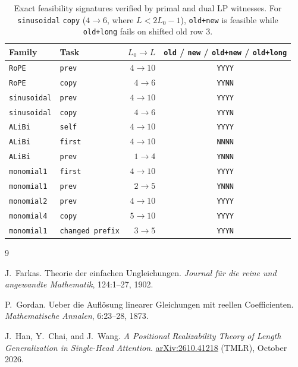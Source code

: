 \documentclass[11pt]{article}
\theoremstyle{plain}
\theoremstyle{definition}
\theoremstyle{remark}
\begin{document}
\begin{table}[h]
\centering
\begin{tabular}{@{}llrc@{}}
\toprule
Family & Task & $L_0 \to L$ & \texttt{old} / \texttt{new} / \texttt{old+new} / \texttt{old+long} \\
\midrule
\texttt{RoPE}       & \texttt{prev}           & $4 \to 10$ & \texttt{YYYY} \\
\texttt{RoPE}       & \texttt{copy}           & $4 \to 6$  & \texttt{YYNN} \\
\texttt{sinusoidal} & \texttt{prev}           & $4 \to 10$ & \texttt{YYYY} \\
\texttt{sinusoidal} & \texttt{copy}           & $4 \to 6$  & \texttt{YYYN} \\
\texttt{ALiBi}      & \texttt{self}           & $4 \to 10$ & \texttt{YYYY} \\
\texttt{ALiBi}      & \texttt{first}          & $4 \to 10$ & \texttt{NNNN} \\
\texttt{ALiBi}      & \texttt{prev}           & $1 \to 4$  & \texttt{YNNN} \\
\texttt{monomial1}  & \texttt{first}          & $4 \to 10$ & \texttt{YYYY} \\
\texttt{monomial1}  & \texttt{prev}           & $2 \to 5$  & \texttt{YNNN} \\
\texttt{monomial2}  & \texttt{prev}           & $4 \to 10$ & \texttt{YYYY} \\
\texttt{monomial4}  & \texttt{copy}           & $5 \to 10$ & \texttt{YYYY} \\
\texttt{monomial1}  & \texttt{changed prefix} & $3 \to 5$  & \texttt{YYYN} \\
\bottomrule
\end{tabular}
\caption{Exact feasibility signatures verified by primal and dual LP witnesses. For \texttt{sinusoidal} \texttt{copy} ($4 \to 6$, where $L < 2L_0 - 1$), \texttt{old+new} is feasible while \texttt{old+long} fails on shifted old row $3$.}\label{tab:cases}
\end{table}

\begin{thebibliography}{9}

J.~Farkas.
Theorie der einfachen Ungleichungen.
\emph{Journal f\"ur die reine und angewandte Mathematik}, 124:1--27, 1902.

P.~Gordan.
Ueber die Aufl\"osung linearer Gleichungen mit reellen Coefficienten.
\emph{Mathematische Annalen}, 6:23--28, 1873.

J.~Han, Y.~Chai, and J.~Wang.
\emph{A Positional Realizability Theory of Length Generalization in Single-Head Attention}.
\href{https://arxiv.org/abs/2610.41218}{arXiv:2610.41218} (TMLR), October 2026.

\end{thebibliography}
\end{document}
